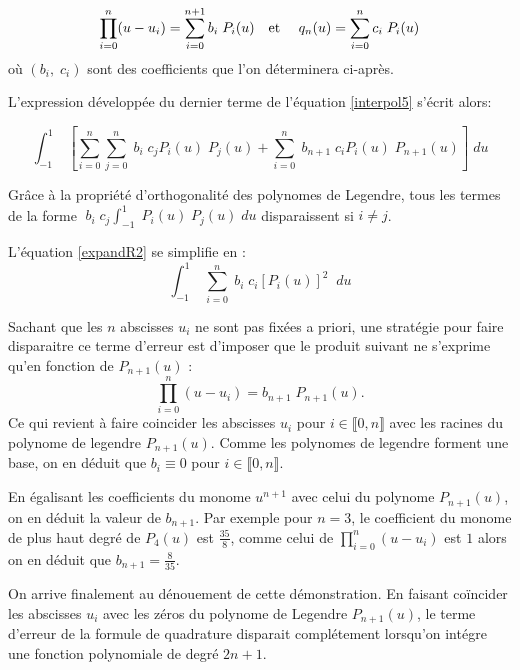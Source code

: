 \documentclass[a4paper, 10pt]{article}
\begin{document}
\begin{equation}
\prod_{i=0}^n (u-u_i)= \sum_{i=0}^{n+1} b_i \; P_i(u) \text{\quad et \quad} q_n(u) = \sum_{i=0}^{n} c_i \; P_i(u)
\label{expandR1}
\end{equation}
où $(b_i, \; c_i)$ sont des coefficients que l'on déterminera ci-après.

L'expression développée du dernier terme de l'équation \ref{interpol5} s'écrit alors:

\begin{equation}
\int_{-1}^{1}\; \left[ \sum_{i=0}^{n}  \sum_{j=0}^{n} \; b_i\; c_j P_i(u)\; P_j(u) + \sum_{i=0}^{n}\; b_{n+1} \;c_i P_i(u) \; P_{n+1}(u) \right] \; du
\label{expandR2}
\end{equation}

Grâce à la propriété d'orthogonalité des polynomes de Legendre, tous les termes de la forme $\; b_i\; c_j \int_{-1}^{1}\; P_i(u)\; P_j(u)\; du $
disparaissent si $i \ne j$.

L'équation \ref{expandR2} se simplifie en :
\begin{equation}
\int_{-1}^{1}\; \sum_{i=0}^{n}  \; b_i\; c_i \left[P_i(u) \right]^2\; \; du
\label{expandR3}
\end{equation}


Sachant que les $n$ abscisses $u_i$ ne sont pas fixées a priori,
une stratégie pour faire disparaitre ce terme d'erreur est  d'imposer que le produit suivant ne s'exprime
qu'en fonction de $P_{n+1}(u) $ : 
\begin{equation}
\prod_{i=0}^n (u-u_i)= b_{n+1} \; P_{n+1}(u) .
\label{prod1}
\end{equation}
Ce qui revient à faire coincider les abscisses $u_i$  pour  
$i \in  \llbracket  0, n  \rrbracket $ avec les racines du polynome de legendre  $P_{n+1}(u) $.
Comme les polynomes de legendre forment une base,  on en déduit que $b_i \equiv 0$ pour  
$i \in  \llbracket  0, n  \rrbracket $.

En égalisant les coefficients du monome $u^{n+1}$ avec celui du polynome  $P_{n+1}(u)$, on en déduit
la valeur de $b_{n+1}$.
Par exemple pour $n=3$, le coefficient du monome de plus haut degré de $P_4(u)$ est $\frac{35}{8}$, comme
celui de $\prod_{i=0}^n (u-u_i)$ est $1$ alors on en déduit que $b_{n+1}=\frac{8}{35}$.

On arrive finalement au dénouement de cette démonstration. En faisant coïncider les abscisses $u_i$ avec les zéros du 
polynome de Legendre $P_{n+1}(u)$, le terme d'erreur de la formule de quadrature
disparait complétement  lorsqu'on intégre une fonction polynomiale de degré $2n+1$.
\end{document}
